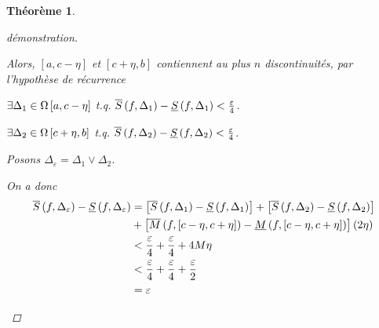 \documentclass{report}
\newcommand*{\raffinement}[2]{#1 \vee #2}
\newcommand*{\eps}{\varepsilon}
\newtheorem*{thm}{Th\'eor\`eme}
\theoremstyle{definition}
\theoremstyle{remark}
\begin{document}
\begin{thm}
\begin{proof}[d\'emonstration]
\begin{enumerate}
				Alors, $[a,c-\eta]$ et $[c+\eta,b]$ contiennent au plus $n$ discontinuit\'es, par l'hypoth\`ese de r\'ecurrence

				$\exists\Delta_1\in \partitions[a,c-\eta]$ t.q.  $\ssup{f}[\Delta_1] - \sinf{f}[\Delta_1] < \frac{\eps}{4}$.

				$\exists\Delta_2\in \partitions[c+\eta,b]$ t.q.  $\ssup{f}[\Delta_2] - \sinf{f}[\Delta_2] < \frac{\eps}{4}$.

				Posons $\Delta_\eps = \raffinement{\Delta_1}{\Delta_2}$.

				On a donc
				\begin{align*}
					\ssup{f}[\Delta_\eps] - \sinf{f}[\Delta_\eps] &= \left[ \ssup{f}[\Delta_1] - \sinf{f}[\Delta_1] \right] + \left[ \ssup{f}[\Delta_2] - \sinf{f}[\Delta_2] \right]\\
					&+ \left[ \msup{f}[c-\eta,c+\eta] - \minf{f}[c-\eta,c+\eta] \right] \left( 2\eta \right)\\
					&< \dfrac{\eps}{4} + \dfrac{\eps}{4} + 4M\eta\\
					&< \dfrac{\eps}{4} + \dfrac{\eps}{4} + \dfrac{\eps}{2}\\
					&= \eps
				\end{align*}
			\end{enumerate}
		\end{proof}
	\end{thm}
\end{document}
